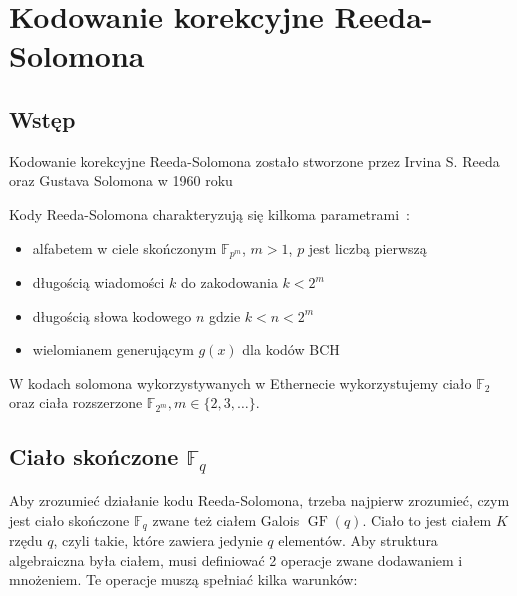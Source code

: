 \section{Kodowanie korekcyjne Reeda-Solomona}
\subsection{Wstęp}

Kodowanie korekcyjne Reeda-Solomona zostało stworzone przez Irvina S. Reeda
oraz Gustava Solomona w 1960 roku~\cite{Reed-Solomon-original}

Kody Reeda-Solomona charakteryzują się kilkoma parametrami~\cite{Reed-Solomon-Encoding-Decoding}:
\begin{itemize}
    \item alfabetem w ciele skończonym $\mathbb{F}_{p^m}$, $m>1$, $p$ jest liczbą
    pierwszą
    \item długością wiadomości $k$ do zakodowania $k < 2^{m}$
    \item długością słowa kodowego $n$ gdzie $k < n < 2^{m}$
    \item wielomianem generującym $g(x)$ dla kodów BCH
\end{itemize}

W kodach solomona wykorzystywanych w Ethernecie wykorzystujemy ciało $\mathbb{F}_2$ oraz ciała rozszerzone
$\mathbb{F}_{2^m}, m \in \{ 2, 3, \ldots \}$.

\subsection{Ciało skończone $\mathbb{F}_{q}$}

Aby zrozumieć działanie kodu Reeda-Solomona, trzeba najpierw zrozumieć, czym jest
ciało skończone $\mathbb{F}_q$ zwane też ciałem Galois $\operatorname{GF}(q)$.
Ciało to jest ciałem $K$ rzędu $q$, czyli takie, które zawiera jedynie $q$ elementów.
Aby struktura algebraiczna była ciałem, musi definiować 2 operacje zwane
dodawaniem i mnożeniem.
Te operacje muszą spełniać kilka warunków:

